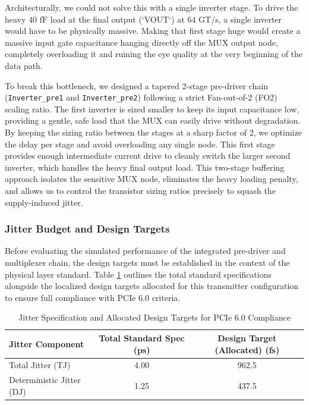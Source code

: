 Architecturally, we could not solve this with a single inverter stage. To drive the heavy $40\text{ fF}$ load at the final output (`VOUT`) at 64 GT/s, a single inverter would have to be physically massive. Making that first stage huge would create a massive input gate capacitance hanging directly off the MUX output node, completely overloading it and ruining the eye quality at the very beginning of the data path. 

To break this bottleneck, we designed a tapered 2-stage pre-driver chain 
(\texttt{Inverter\_pre1} and \texttt{Inverter\_pre2}) following a strict Fan-out-of-2 (FO2) scaling ratio. The first inverter is sized smaller 
to keep its input capacitance low, providing a gentle, safe load that the MUX can easily drive without degradation. By keeping the sizing ratio between the stages at a sharp factor of 2, we optimize the delay per stage and avoid overloading any single node. This first stage provides enough intermediate current drive to cleanly switch the larger second inverter, which handles the heavy final output 
load. This two-stage buffering approach isolates the sensitive MUX node, eliminates the heavy loading penalty, and allows us to control the transistor sizing ratios precisely to squash the supply-induced jitter.

\subsubsection{Jitter Budget and Design Targets}

Before evaluating the simulated performance of the integrated pre-driver and multiplexer chain, the design targets must be established in the context of the physical layer standard. Table \ref{tab:pcie6_jitter_budget_MUXPRE} outlines the total standard specifications alongside the localized design targets allocated for this transmitter configuration to ensure full compliance with PCIe 6.0 criteria.

\begin{table}[H]
    \centering
    \renewcommand{\arraystretch}{1.3}
    \setlength{\tabcolsep}{14pt}
    \begin{tabular}{|l|c|c|}
        \hline
        Jitter Component & Total Standard Spec (ps) & Design Target (Allocated) (fs) \\ \hline
        Total Jitter (TJ) & 4.00 & 962.5 \\ \hline
        Deterministic Jitter (DJ) & 1.25 & 437.5 \\ \hline
    \end{tabular}
    \vspace{2mm}
    \caption{Jitter Specification and Allocated Design Targets for PCIe 6.0 Compliance}
    \label{tab:pcie6_jitter_budget_MUXPRE}
\end{table}

